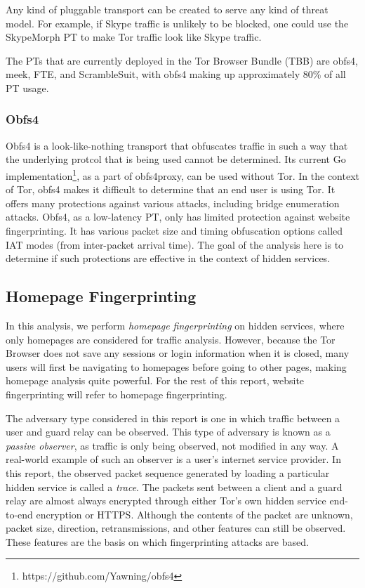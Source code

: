 \documentclass[11pt]{article}
\begin{document}
Any kind of pluggable transport can be created to serve any kind of threat model. For example, if Skype traffic is unlikely to be blocked, one could use the SkypeMorph\cite{skypemorph} PT to make Tor traffic look like Skype traffic.

The PTs that are currently deployed in the Tor Browser Bundle (TBB) are obfs4, meek, FTE, and ScrambleSuit\cite{pts}, with obfs4 making up approximately 80\% of all PT usage.

\subsubsection{Obfs4}
Obfs4 is a look-like-nothing transport that obfuscates traffic in such a way that the underlying protcol that is being used cannot be determined. Its current Go implementation\footnote{https://github.com/Yawning/obfs4}, as a part of obfs4proxy, can be used without Tor. In the context of Tor, obfs4 makes it difficult to determine that an end user is using Tor. It offers many protections against various attacks, including bridge enumeration attacks. Obfs4, as a low-latency PT, only has limited protection against website fingerprinting. It has various packet size and timing obfuscation options called IAT modes (from inter-packet arrival time). The goal of the analysis here is to determine if such protections are effective in the context of hidden services.

\subsection{Homepage Fingerprinting}
In this analysis, we perform \textit{homepage fingerprinting} on hidden services, where only homepages are considered for traffic analysis. However, because the Tor Browser does not save any sessions or login information when it is closed, many users will first be navigating to homepages before going to other pages, making homepage analysis quite powerful. For the rest of this report, website fingerprinting will refer to homepage fingerprinting.

The adversary type considered in this report is one in which traffic between a user and guard relay can be observed. This type of adversary is known as a \textit{passive observer}, as traffic is only being observed, not modified in any way. A real-world example of such an observer is a user's internet service provider. In this report, the observed packet sequence generated by loading a particular hidden service is called a \textit{trace}. The packets sent between a client and a guard relay are almost always encrypted through either Tor's own hidden service end-to-end encryption or HTTPS. Although the contents of the packet are unknown, packet size, direction, retransmissions, and other features can still be observed. These features are the basis on which fingerprinting attacks are based.
\end{document}
